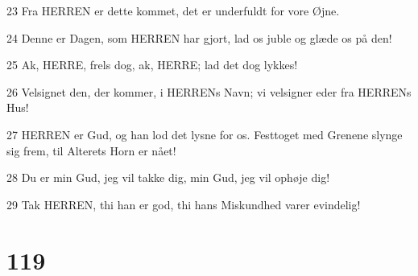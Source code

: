 \par 23 Fra HERREN er dette kommet, det er underfuldt for vore Øjne.
\par 24 Denne er Dagen, som HERREN har gjort, lad os juble og glæde os på den!
\par 25 Ak, HERRE, frels dog, ak, HERRE; lad det dog lykkes!
\par 26 Velsignet den, der kommer, i HERRENs Navn; vi velsigner eder fra HERRENs Hus!
\par 27 HERREN er Gud, og han lod det lysne for os. Festtoget med Grenene slynge sig frem, til Alterets Horn er nået!
\par 28 Du er min Gud, jeg vil takke dig, min Gud, jeg vil ophøje dig!
\par 29 Tak HERREN, thi han er god, thi hans Miskundhed varer evindelig!

\chapter{119}


